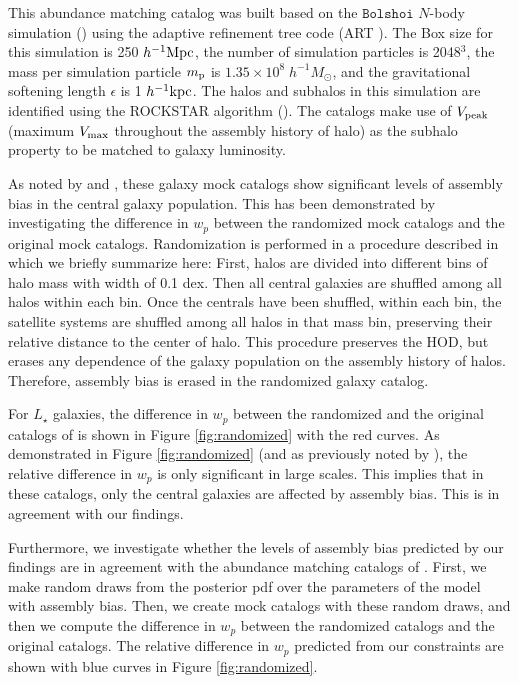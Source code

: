 \documentclass[12pt, preprint]{aastex}
\begin{document}
This abundance matching catalog was built based on the $\mathtt{Bolshoi}$ $N$-body simulation (\citealt{Klypin2011}) using the adaptive refinement tree code (ART \citealt{art}). The Box size for this simulation is 250 $h^{-1} \rm{Mpc}$, the number of simulation particles is 2048$^3$, the mass per simulation particle $m_{\rm p}$ is $1.35 \times 10^{8} \; h^{-1} M_{\odot}$, and the gravitational softening length $\epsilon$ is 1 $h^{-1} \rm{kpc}$. The halos and subhalos in this simulation are identified using the ROCKSTAR algorithm (\citealt{rockstar}). 
The \citealt{hw2013} catalogs make use of $V_{\rm peak}$ (maximum $V_{\rm max}$ throughout the assembly history of halo) as the subhalo property to be matched to galaxy luminosity. 

As noted by \citet{arz2014} and \citet{edHOD-weinberg}, these galaxy mock catalogs show significant levels of assembly bias in the central galaxy population. This has been demonstrated by investigating the difference in $w_{p}$ between the randomized mock catalogs and the original mock catalogs. Randomization is performed in a procedure described in \citet{arz2014} which we briefly summarize here: First, halos are divided into different bins of halo mass with width of 0.1 dex. Then all central galaxies are shuffled among all halos within each bin. Once the centrals have been shuffled, within each bin, the satellite systems are shuffled among all halos in that mass bin, preserving their relative distance to the center of halo. This procedure preserves the HOD, but erases any dependence of the galaxy population on the assembly history of halos. Therefore, assembly bias is erased in the randomized galaxy catalog. 

For $L_{\star}$ galaxies, the difference in $w_{p}$ between the randomized and the original catalogs of \citet{hw2013} is shown in Figure \ref{fig:randomized} with the red curves. As demonstrated in Figure \ref{fig:randomized} (and as previously noted by \citealt{arz2014,edHOD-weinberg}), the relative difference in $w_{p}$ is only significant in large scales. This implies that in these catalogs, only the central galaxies are affected by assembly bias. This is in agreement with our findings. 

Furthermore, we investigate whether the levels of assembly bias predicted by our findings are in agreement with the abundance matching catalogs of \citet{hw2013}. First, we make random draws from the posterior pdf over the parameters of the model with assembly bias. Then, we create mock catalogs with these random draws, and then we compute the difference in $w_{p}$ between the randomized catalogs and the original catalogs. The relative difference in $w_{p}$ predicted from our constraints are shown with blue curves in Figure \ref{fig:randomized}. 
\end{document}
